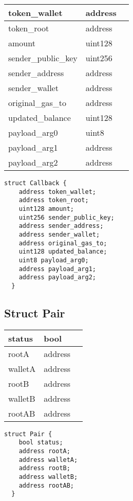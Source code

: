 \ifsoltables
\noindent\begin{tabular}{|l|l|p{6cm}|}\hline
token\_{}wallet & address & \\\hline
token\_{}root & address & \\\hline
amount & uint128 & \\\hline
sender\_{}public\_{}key & uint256 & \\\hline
sender\_{}address & address & \\\hline
sender\_{}wallet & address & \\\hline
original\_{}gas\_{}to & address & \\\hline
updated\_{}balance & uint128 & \\\hline
payload\_{}arg0 & uint8 & \\\hline
payload\_{}arg1 & address & \\\hline
payload\_{}arg2 & address & \\\hline
\end{tabular}
\fi


\begin{lstlisting}[firstnumber=43]
  struct Callback {
    address token_wallet;
    address token_root;
    uint128 amount;
    uint256 sender_public_key;
    address sender_address;
    address sender_wallet;
    address original_gas_to;
    uint128 updated_balance;
    uint8 payload_arg0;
    address payload_arg1;
    address payload_arg2;
  }
\end{lstlisting}

\subsection{Struct Pair}


\ifsoltables
\noindent\begin{tabular}{|l|l|p{6cm}|}\hline
status & bool & \\\hline
rootA & address & \\\hline
walletA & address & \\\hline
rootB & address & \\\hline
walletB & address & \\\hline
rootAB & address & \\\hline
\end{tabular}
\fi


\begin{lstlisting}[firstnumber=60]
  struct Pair {
    bool status;
    address rootA;
    address walletA;
    address rootB;
    address walletB;
    address rootAB;
  }
\end{lstlisting}

